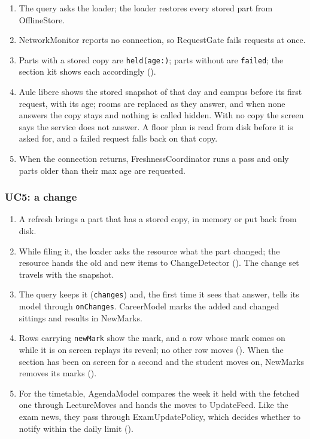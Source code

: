 \begin{enumerate}
  \item The query asks the loader; the loader restores every stored part from OfflineStore.
  \item NetworkMonitor reports no connection, so RequestGate fails requests at once.
  \item Parts with a stored copy are \texttt{held(age:)}; parts without are \texttt{failed}; the section kit shows each accordingly ().
  \item Aule libere shows the stored snapshot of that day and campus before its first request, with its age; rooms are replaced as they answer, and when none answers the copy stays and nothing is called hidden. With no copy the screen says the service does not answer. A floor plan is read from disk before it is asked for, and a failed request falls back on that copy.
  \item When the connection returns, FreshnessCoordinator runs a pass and only parts older than their max age are requested.
\end{enumerate}

\subsubsection{UC5: a change}
\begin{enumerate}
  \item A refresh brings a part that has a stored copy, in memory or put back from disk.
  \item While filing it, the loader asks the resource what the part changed; the resource hands the old and new items to ChangeDetector (). The change set travels with the snapshot.
  \item The query keeps it (\texttt{changes}) and, the first time it sees that answer, tells its model through \texttt{onChanges}. CareerModel marks the added and changed sittings and results in NewMarks.
  \item Rows carrying \texttt{newMark} show the mark, and a row whose mark comes on while it is on screen replays its reveal; no other row moves (). When the section has been on screen for a second and the student moves on, NewMarks removes its marks ().
  \item For the timetable, AgendaModel compares the week it held with the fetched one through LectureMoves and hands the moves to UpdateFeed. Like the exam news, they pass through ExamUpdatePolicy, which decides whether to notify within the daily limit ().
\end{enumerate}

